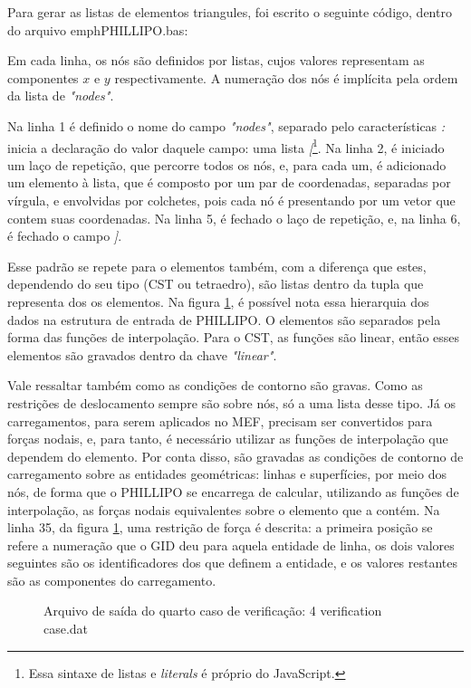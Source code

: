 Para gerar as listas de elementos triangules, foi escrito o seguinte código, dentro do arquivo emph{PHILLIPO.bas}:

Em cada linha, os nós são definidos por listas, cujos valores representam as componentes $x$ e $y$ respectivamente. A numeração dos nós é implícita pela ordem da lista de \emph{"nodes"}.

Na linha 1 é definido o nome do campo \emph{"nodes"}, separado pelo características \emph{:} inicia a declaração do valor daquele campo: uma lista \emph{[}\footnote{Essa sintaxe de listas e \emph{literals} é próprio do JavaScript.}. Na linha 2, é iniciado um laço de repetição, que percorre todos os nós, e, para cada um, é adicionado um elemento à lista, que é composto por um par de coordenadas, separadas por vírgula, e envolvidas por colchetes, pois cada nó é presentando por um vetor que contem suas coordenadas. Na linha 5, é fechado o laço de repetição, e, na linha 6, é fechado o campo \emph{]}. 

Esse padrão se repete para o elementos também, com a diferença que estes, dependendo do seu tipo (CST ou tetraedro), são listas dentro da tupla que representa dos os elementos. Na figura \ref{fig:PHILLIPO.bas}, é possível nota essa hierarquia dos dados na estrutura de entrada de PHILLIPO. O elementos são separados pela forma das funções de interpolação. Para o CST, as funções são linear, então esses elementos são gravados dentro da chave \emph{"linear"}. 

Vale ressaltar também como as condições de contorno são gravas. Como as restrições de deslocamento sempre são sobre nós, só a uma lista desse tipo. Já os carregamentos, para serem aplicados no MEF, precisam ser convertidos para forças nodais, e, para tanto, é necessário utilizar as funções de interpolação que dependem do elemento. Por conta disso, são gravadas as condições de contorno de carregamento sobre as entidades geométricas: linhas e superfícies, por meio dos nós, de forma que o PHILLIPO se encarrega de calcular, utilizando as funções de interpolação, as forças nodais equivalentes sobre o elemento que a contém. Na linha 35, da figura \ref{fig:PHILLIPO.bas}, uma restrição de força é descrita: a primeira posição se refere a numeração que o GID deu para aquela entidade de linha, os dois valores seguintes são os identificadores dos que definem a entidade, e os valores restantes são as componentes do carregamento.

\begin{figure}[hbtp]
    \caption{Arquivo de saída do quarto caso de verificação: 4 verification case.dat}
    
    \label{fig:PHILLIPO.bas}
\end{figure}



